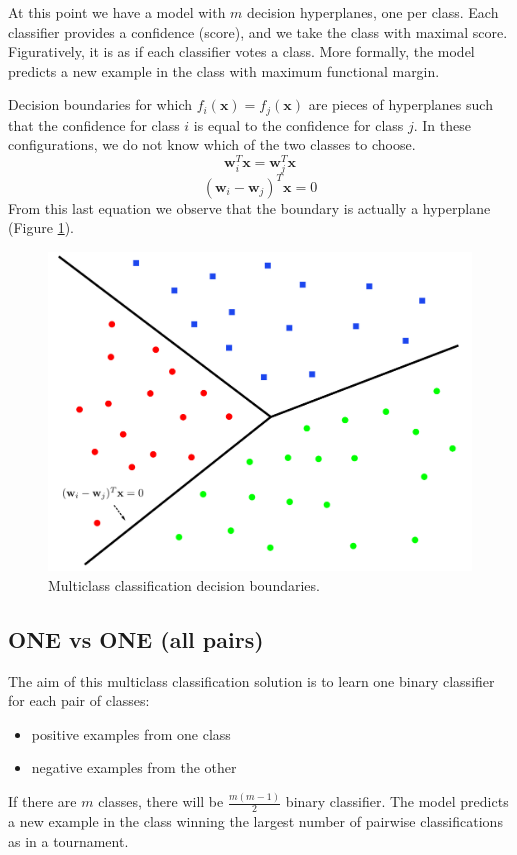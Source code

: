 At this point we have a model with $m$ decision hyperplanes, one per class. Each classifier provides a confidence (score), and we take the class with maximal score. Figuratively, it is as if each classifier votes a class. More formally, the model predicts a new example in the class with maximum functional margin. \newline

Decision boundaries for which $f_i(\pmb{x}) = f_j(\pmb{x})$ are pieces of hyperplanes such that the confidence for class $i$ is equal to the confidence for class $j$. In these configurations, we do not know which of the two classes to choose.
$$\pmb{w}_i^T \pmb{x} = \pmb{w}_j^T \pmb{x}$$
$$(\pmb{w}_i - \pmb{w}_j)^T \pmb{x} = 0$$
From this last equation we observe that the boundary is actually a hyperplane (Figure \ref{fig:oneVsAllMulticlassClassification}).

\begin{figure}
    \centering
    \includegraphics[scale=0.3]{images/oneVsAllMulticlassClassification.png}
    \caption{Multiclass classification decision boundaries.}
    \label{fig:oneVsAllMulticlassClassification}
\end{figure}

\subsection{ONE vs ONE (all pairs)}
The aim of this multiclass classification solution is to learn one binary classifier for each pair of classes:
\begin{itemize}
    \item positive examples from one class
    \item negative examples from the other
\end{itemize}
If there are $m$ classes, there will be $\frac{m(m-1)}{2}$ binary classifier. The model predicts a new example in the class winning the largest number of pairwise classifications as in a tournament.

